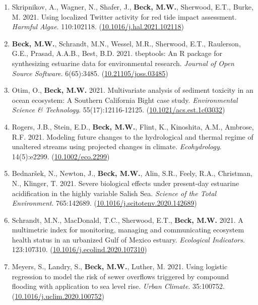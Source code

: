\documentclass[letterpaper,12pt]{article}
\begin{document}
\begin{enumerate}
\item Skripnikov, A., Wagner, N., Shafer, J., \textbf{Beck, M.W.}, Sherwood, E.T., Burke, M. 2021. Using localized Twitter activity for red tide impact assessment. \textit{Harmful Algae}. 110:102118. ({\footnotesize\href{https://doi.org/10.1016/j.hal.2021.102118}{10.1016/j.hal.2021.102118}})

\item \textbf{Beck, M.W.}, Schrandt, M.N., Wessel, M.R., Sherwood, E.T., Raulerson, G.E., Prasad, A.A.B., Best, B.D. 2021. tbeptools: An R package for synthesizing estuarine data for environmental research. \textit{Journal of Open Source Software}. 6(65):3485. ({\footnotesize\href{https://doi.org/10.21105/joss.03485}{10.21105/joss.03485}})

\item Otim, O., \textbf{Beck, M.W.} 2021. Multivariate analysis of sediment toxicity in an ocean ecosystem: A Southern California Bight case study. \textit{Environmental Science \& Technology}. 55(17):12116-12125. ({\footnotesize\href{https://doi.org/10.1021/acs.est.1c03032}{10.1021/acs.est.1c03032}})

\item Rogers, J.B., Stein, E.D., \textbf{Beck, M.W.}, Flint, K., Kinoshita, A.M., Ambrose, R.F. 2021. Modeling future changes to the hydrological and thermal regime of unaltered streams using projected changes in climate. \textit{Ecohydrology}. 14(5):e2299. ({\footnotesize\href{https://doi.org/10.1002/eco.2299}{10.1002/eco.2299}})

\item Bednar\v{s}ek, N., Newton, J., \textbf{Beck, M.W.}, Alin, S.R., Feely, R.A., Christman, N., Klinger, T. 2021. Severe biological effects under present-day estuarine acidification in the highly variable {S}alish {S}ea. \textit{Science of the Total Environment}. 765:142689. ({\footnotesize\href{https://doi.org/10.1016/j.scitotenv.2020.142689}{10.1016/j.scitotenv.2020.142689}})

\item Schrandt, M.N., MacDonald, T.C., Sherwood, E.T., \textbf{Beck, M.W.} 2021. A multimetric index for monitoring, managing and communicating ecosystem health status in an urbanized Gulf of Mexico estuary. \textit{Ecological Indicators}. 123:107310. ({\footnotesize\href{https://doi.org/10.1016/j.ecolind.2020.107310}{10.1016/j.ecolind.2020.107310}})

\item Meyers, S., Landry, S., \textbf{Beck, M.W.}, Luther, M. 2021. Using logistic regression to model the risk of sewer overflows triggered by compound flooding with application to sea level rise. \textit{Urban Climate}. 35:100752. ({\footnotesize\href{https://doi.org/10.1016/j.uclim.2020.100752}{10.1016/j.uclim.2020.100752}})


\end{enumerate}
\end{document}
